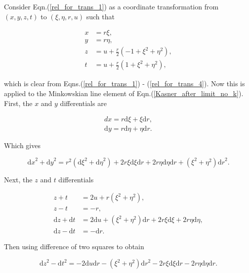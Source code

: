 Consider Eqn.(\ref{rel_for_trans_1}) as a coordinate transformation from $(x,y,z,t)$ to $(\xi,\eta, r, u )$ such that

\begin{align}
x & = r \xi, \nonumber \\
y & = r \eta, \nonumber \\
z & = u + \frac{r}{2} (-1 + \xi^2 + \eta^2), \nonumber \\
t & = u + \frac{r}{2} (1 + \xi^2 + \eta^2),  \label{trans_x_to_xi} 
\end{align} 

\noindent which is clear from Eqns.(\ref{rel_for_trans_1}) - (\ref{rel_for_trans_4}). Now this is applied to the Minkowskian line element of Eqn.(\ref{Kasner_after_limit_no_k}). First, the $x$ and $y$ differentials are

\begin{eqnarray*} 
dx = r \mathrm{d}\xi + \xi \mathrm{d}r, \\
\mathrm{d}y = r \mathrm{d}\eta + \eta \mathrm{d}r. 
\end{eqnarray*} 

\noindent Which gives

\begin{equation}\label{differentials_1}
{\mathrm{d}x}^2 + {\mathrm{d}y}^2 = r^2 ({\mathrm{d}\xi}^2 + {\mathrm{d}\eta}^2) + 2 r \xi {\mathrm{d}\xi} {\mathrm{d}r} + 2 r \eta {\mathrm{d}\eta}{\mathrm{d}r} + (\xi^2 + \eta^2) {\mathrm{d}r}^2.
\end{equation}

\noindent Next, the $z$ and $t$ differentials

\begin{align*}
z + t & = 2 u + r (\xi^2 + \eta^2), \\
z - t & = - r, \\
{\mathrm{d}z} + {\mathrm{d}t} & = 2 \mathrm{d}u + (\xi^2 + \eta^2) \mathrm{d}r + 2 r \xi {\mathrm{d}\xi} + 2 r \eta {\mathrm{d}\eta}, \\
{\mathrm{d}z} - {\mathrm{d}t} & = - \mathrm{d}r. 
\end{align*}

\noindent Then using difference of two squares to obtain

\begin{equation}\label{differentials_2}
{\mathrm{d}z}^2 - {\mathrm{d}t}^2 = -2 {\mathrm{d}u}{\mathrm{d}r} - (\xi^2 + \eta^2) {\mathrm{d}r}^2 - 2 r \xi {\mathrm{d}\xi}{\mathrm{d}r} - 2 r \eta {\mathrm{d}\eta}{\mathrm{d}r}.
\end{equation}


